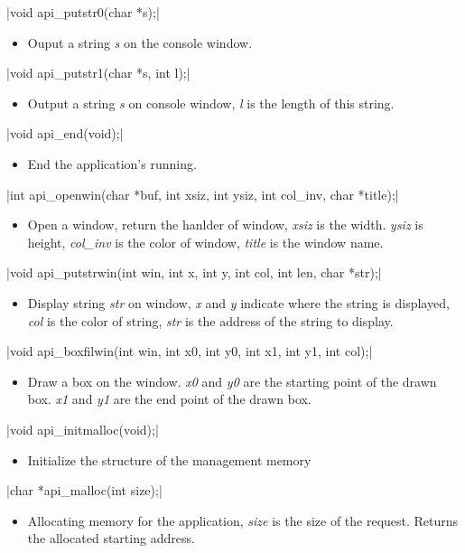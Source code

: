 \documentclass{swfcthesis}
\begin{document}
\csingle|void api_putstr0(char *s);|
\begin{itemize}
\item Ouput a string \emph{s} on the console window.
\end{itemize}

\csingle|void api_putstr1(char *s, int l);|
\begin{itemize}
\item Output a string \emph{s} on console window, \emph{l} is the length of this string.
\end{itemize}

\csingle|void api_end(void);|
\begin{itemize}
\item End the application's running.
\end{itemize}

\csingle|int api_openwin(char *buf, int xsiz, int ysiz, int col_inv, char *title);|
\begin{itemize}
\item Open a window, return the hanlder of window, \emph{xsiz} is the width. \emph{ysiz}
  is height, \emph{col\_inv} is the color of window, \emph{title} is the window name.
\end{itemize}

\csingle|void api_putstrwin(int win, int x, int y, int col, int len, char *str);|
\begin{itemize}
\item Display string \emph{str} on window, \emph{x} and \emph{y} indicate where the string
  is displayed, \emph{col} is the color of string, \emph{str} is the address of the string
  to display.
\end{itemize}

\csingle|void api_boxfilwin(int win, int x0, int y0, int x1, int y1, int col);|
\begin{itemize}
\item Draw a box on the window. \emph{x0} and \emph{y0} are the starting point of the
  drawn box. \emph{x1} and \emph{y1} are the end point of the drawn box.
  
\end{itemize}

\csingle|void api_initmalloc(void);|
\begin{itemize}
\item Initialize the structure of the management memory
\end{itemize}

\csingle|char *api_malloc(int size);|
\begin{itemize}
\item Allocating memory for the application, \emph{size} is the size of the
  request. Returns the allocated starting address.
  
\end{itemize}
\end{document}
